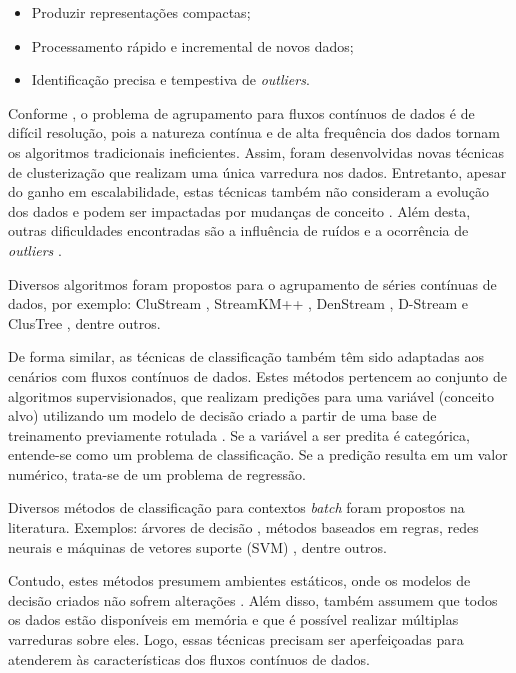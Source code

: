 \documentclass[qual, classic, a4paper]{ufbathesis}
\begin{document}
\begin{itemize}
    \item Produzir representações compactas;
    \item Processamento rápido e incremental de novos dados;
    \item Identificação precisa e tempestiva de \textit{outliers}.
\end{itemize}

Conforme \cite{Aggarwal:2003:FCE:1315451.1315460}, o problema de agrupamento para fluxos contínuos de dados é de difícil resolução,
pois a natureza contínua e de alta frequência dos dados tornam os algoritmos tradicionais ineficientes.
Assim, foram desenvolvidas novas técnicas de clusterização que realizam uma única varredura nos dados. 
Entretanto, apesar do ganho em escalabilidade, estas técnicas também não consideram a evolução dos dados e podem ser impactadas por mudanças de conceito \cite{Aggarwal:2003:FCE:1315451.1315460}.
Além desta, outras dificuldades encontradas são a influência de ruídos e a ocorrência de \textit{outliers} \cite{Khalilian:DBLP:journals/corr/abs-1006-5261}.

Diversos algoritmos foram propostos para o agrupamento de séries contínuas de dados, por exemplo: 
CluStream \cite{Aggarwal:2003:FCE:1315451.1315460},
StreamKM++ \cite{Ackermann:2012:SCA:2133803.2184450},
DenStream \cite{Cao:Feng:Ester},
D-Stream \cite{Chen:Tu} e ClusTree \cite{Kranen:2011:CIM:2134350.2134352}, dentre outros.

De forma similar, as técnicas de classificação também têm sido adaptadas aos cenários com fluxos contínuos de dados.
Estes métodos pertencem ao conjunto de algoritmos supervisionados, 
que realizam predições para uma variável (conceito alvo) utilizando um modelo de decisão criado a partir de uma base de treinamento previamente rotulada \cite{Kotsiantis:2007:SML:1566770.1566773}.
Se a variável a ser predita é categórica, entende-se como um problema de classificação.
Se a predição resulta em um valor numérico, trata-se de um problema de regressão.

Diversos métodos de classificação para contextos \textit{batch} foram propostos na literatura. Exemplos:
árvores de decisão \cite{Breiman:Classification_Regression_Trees},
métodos baseados em regras, 
redes neurais e máquinas de vetores suporte (SVM) \cite{Vapnik1998}, 
dentre outros.

Contudo, estes métodos presumem ambientes estáticos, onde os modelos de decisão criados não sofrem alterações \cite{Aggarwal:2006:DSM:1196418}.
Além disso, também assumem que todos os dados estão disponíveis em memória e que é possível realizar múltiplas varreduras sobre eles.
Logo, essas técnicas precisam ser aperfeiçoadas para atenderem às características dos fluxos contínuos de dados.
\end{document}
